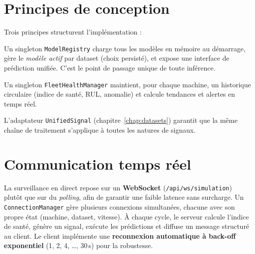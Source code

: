 \section{Principes de conception}
Trois principes structurent l'implémentation :
\begin{description}[leftmargin=1.5em, style=nextline]
  \item[Registre de modèles centralisé.] Un singleton \texttt{ModelRegistry} charge tous
        les modèles en mémoire au démarrage, gère le \emph{modèle actif} par dataset
        (choix persisté), et expose une interface de prédiction unifiée. C'est le point de
        passage unique de toute inférence.
  \item[Gestionnaire de flotte.] Un singleton \texttt{FleetHealthManager} maintient, pour
        chaque machine, un historique circulaire (indice de santé, RUL, anomalie) et calcule
        tendances et alertes en temps réel.
  \item[Pipeline unifié.] L'adaptateur \texttt{UnifiedSignal} (chapitre~\ref{chap:datasets})
        garantit que la même chaîne de traitement s'applique à toutes les natures de
        signaux.
\end{description}

\section{Communication temps réel}
La surveillance en direct repose sur un \textbf{WebSocket} (\texttt{/api/ws/simulation})
plutôt que sur du \emph{polling}, afin de garantir une faible latence sans surcharge. Un
\texttt{ConnectionManager} gère plusieurs connexions simultanées, chacune avec son propre
état (machine, dataset, vitesse). À chaque cycle, le serveur calcule l'indice de santé,
génère un signal, exécute les prédictions et diffuse un message structuré au client. Le
client implémente une \textbf{reconnexion automatique à back-off exponentiel} (1, 2, 4,
\dots, 30\,s) pour la robustesse.

